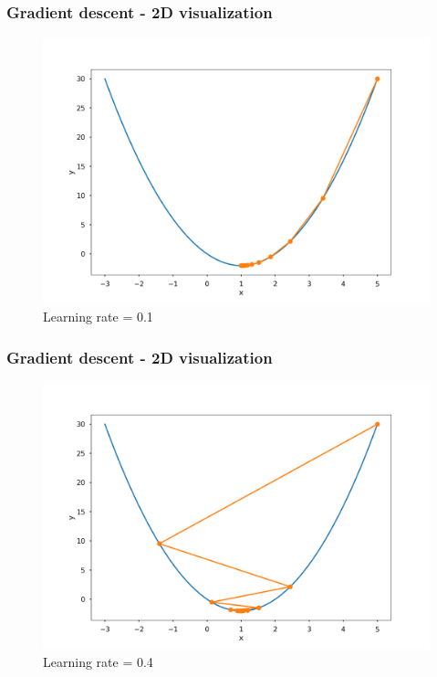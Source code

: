 \documentclass{beamer}
\begin{document}
	\begin{frame}
		\frametitle{Gradient descent - 2D visualization}
		\begin{figure}
			\centering
			\includegraphics[scale=0.3]{images/gradient_descent_1}
			\caption{Learning rate = 0.1}
		\end{figure}
	\end{frame}

	\begin{frame}
		\frametitle{Gradient descent - 2D visualization}
		\begin{figure}
			\centering
			\includegraphics[scale=0.3]{images/gradient_descent_2}
			\caption{Learning rate = 0.4}
		\end{figure}
	\end{frame}
\end{document}
